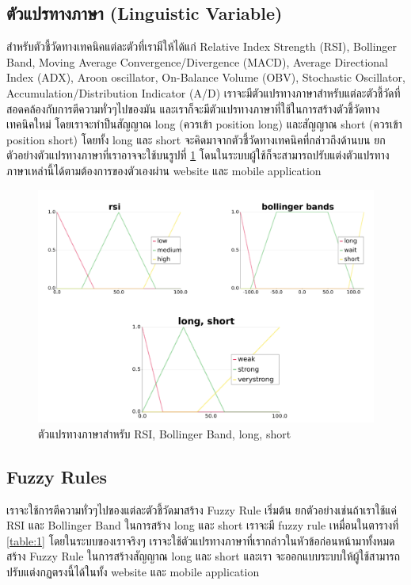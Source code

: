 \subsection{ตัวแปรทางภาษา (Linguistic Variable)}
สำหรับตัวชี้วัดทางเทคนิคแต่ละตัวที่เรามีให้ได้แก่ Relative Index Strength (RSI), Bollinger Band, Moving Average Convergence/Divergence 
(MACD), Average Directional Index (ADX), Aroon oscillator, On-Balance Volume (OBV), Stochastic Oscillator, 
Accumulation/Distribution Indicator (A/D) เราจะมีตัวแปรทางภาษาสำหรับแต่ละตัวชี้วัดที่สอดคล้องกับการตีความทั่วๆไปของมัน
และเราก็จะมีตัวแปรทางภาษาที่ใช้ในการสร้างตัวชี้วัดทางเทคนิคใหม่ โดยเราจะทำป็นสัญญาณ long (ควรเข้า position long) และสัญญาณ short (ควรเข้า position short) โดยทั้ง long และ short
จะคิดมาจากตัวชี้วัดทางเทคนิคที่กล่าวถึงด้านบน ยกตัวอย่างตัวแปรทางภาษาที่เราอาจจะใช้บนรูปที่ \ref{fig:8} โดนในระบบผู้ใช้ก็จะสามารถปรับแต่งตัวแปรทางภาษาเหล่านี้ได้ตามต้องการของตัวเองผ่าน website 
และ mobile application

\begin{figure}[ht]
    \centering
    \includegraphics[width=\textwidth]{images/linguistic.png}
    \caption{ตัวแปรทางภาษาสำหรับ RSI, Bollinger Band, long, short}
    \label{fig:8}
\end{figure}

\subsection{Fuzzy Rules}
เราจะใช้การตีความทั่วๆไปของแต่ละตัวชี้วัดมาสร้าง Fuzzy Rule เริ่มต้น ยกตัวอย่างเช่นถ้าเราใช้แค่ RSI และ Bollinger Band ในการสร้าง long และ short เราจะมี fuzzy rule 
เหมื่อนในตารางที่ \ref{table:1} โดยในระบบของเราจริงๆ เราจะใช้ตัวแปรทางภาษาที่เรากล่าวในหัวข้อก่อนหน้ามาทั้งหมดสร้าง Fuzzy Rule ในการสร้างสัญญาณ long และ short และเรา
จะออกแบบระบบให้ผู้ใช้สามารถปรับแต่งกฏตรงนี้ได้ในทั้ง website และ mobile application

